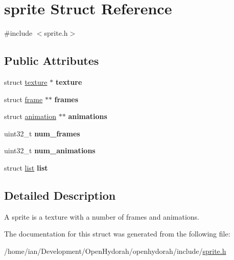 \hypertarget{structsprite}{\section{sprite Struct Reference}
\label{structsprite}
}


{\ttfamily \#include $<$sprite.\-h$>$}

\subsection*{Public Attributes}
\begin{DoxyCompactItemize}
\item 
\hypertarget{structsprite_a0e468b0ca80b748f963f7e90ada13175}{struct \hyperlink{structtexture}{texture} $\ast$ {\bfseries texture}}\label{structsprite_a0e468b0ca80b748f963f7e90ada13175}

\item 
\hypertarget{structsprite_ac54c61f84eb73ba45856acff723203e9}{struct \hyperlink{structframe}{frame} $\ast$$\ast$ {\bfseries frames}}\label{structsprite_ac54c61f84eb73ba45856acff723203e9}

\item 
\hypertarget{structsprite_a357e90ad55dc84ced14a6f4e2a176180}{struct \hyperlink{structanimation}{animation} $\ast$$\ast$ {\bfseries animations}}\label{structsprite_a357e90ad55dc84ced14a6f4e2a176180}

\item 
\hypertarget{structsprite_ad60d36348aa2c3dd2046e768f49e0715}{uint32\-\_\-t {\bfseries num\-\_\-frames}}\label{structsprite_ad60d36348aa2c3dd2046e768f49e0715}

\item 
\hypertarget{structsprite_afc2324194b07238571656dd63340d4b7}{uint32\-\_\-t {\bfseries num\-\_\-animations}}\label{structsprite_afc2324194b07238571656dd63340d4b7}

\item 
\hypertarget{structsprite_a7d92484f6229d0609059324e7c974bdc}{struct \hyperlink{structlist}{list} {\bfseries list}}\label{structsprite_a7d92484f6229d0609059324e7c974bdc}

\end{DoxyCompactItemize}


\subsection{Detailed Description}
A sprite is a texture with a number of frames and animations. 

The documentation for this struct was generated from the following file\-:\begin{DoxyCompactItemize}
\item 
/home/ian/\-Development/\-Open\-Hydorah/openhydorah/include/\hyperlink{sprite_8h}{sprite.\-h}\end{DoxyCompactItemize}
